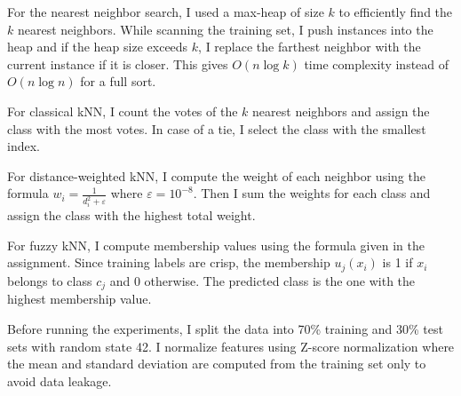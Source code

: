\documentclass[12pt,a4paper]{article}
\begin{document}
For the nearest neighbor search, I used a max-heap of size $k$ to efficiently find the $k$ nearest neighbors. While scanning the training set, I push instances into the heap and if the heap size exceeds $k$, I replace the farthest neighbor with the current instance if it is closer. This gives $O(n \log k)$ time complexity instead of $O(n \log n)$ for a full sort.

For classical kNN, I count the votes of the $k$ nearest neighbors and assign the class with the most votes. In case of a tie, I select the class with the smallest index.

For distance-weighted kNN, I compute the weight of each neighbor using the formula $w_i = \frac{1}{d_i^2 + \varepsilon}$ where $\varepsilon = 10^{-8}$. Then I sum the weights for each class and assign the class with the highest total weight.

For fuzzy kNN, I compute membership values using the formula given in the assignment. Since training labels are crisp, the membership $u_j(x_i)$ is 1 if $x_i$ belongs to class $c_j$ and 0 otherwise. The predicted class is the one with the highest membership value.

Before running the experiments, I split the data into 70\% training and 30\% test sets with random state 42. I normalize features using Z-score normalization where the mean and standard deviation are computed from the training set only to avoid data leakage.
\end{document}
